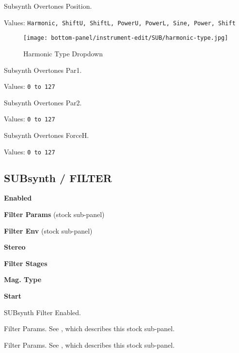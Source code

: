    Subsynth Overtones Position.

   Values: \texttt{Harmonic, ShiftU, ShiftL, PowerU, PowerL, Sine, Power, Shift}

\begin{figure}[H]
   \centering
   \texttt{[image: bottom-panel/instrument-edit/SUB/harmonic-type.jpg]}
   \caption{Harmonic Type Dropdown}
   \label{fig:harmonic_type_dropdown}
\end{figure}

   Subsynth Overtones Par1.

   Values: \texttt{0 to 127}

   Subsynth Overtones Par2.

   Values: \texttt{0 to 127}

   Subsynth Overtones ForceH.

   Values: \texttt{0 to 127}

\subsection{SUBsynth / FILTER}
\label{subsec:subsynth_filter}

   \begin{enumber}
      \item \textbf{Enabled}
      \item \textbf{Filter Params} (stock sub-panel)
      \item \textbf{Filter Env} (stock sub-panel)
      \item \textbf{Stereo}
      \item \textbf{Filter Stages}
      \item \textbf{Mag. Type}
      \item \textbf{Start}
   \end{enumber}

   \setcounter{ItemCounter}{0}      %

   SUBsynth Filter Enabled.

   Filter Params.  See
   ,
   which describes this stock sub-panel.

   Filter Params.  See
   ,
   which describes this stock sub-panel.

